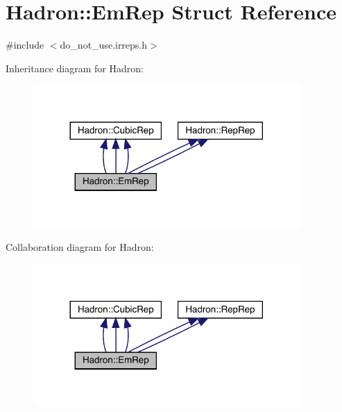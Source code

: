 \hypertarget{structHadron_1_1EmRep}{}\section{Hadron\+:\+:Em\+Rep Struct Reference}
\label{structHadron_1_1EmRep}


{\ttfamily \#include $<$do\+\_\+not\+\_\+use.\+irreps.\+h$>$}



Inheritance diagram for Hadron\+:
\nopagebreak
\begin{figure}[H]
\begin{center}
\leavevmode
\includegraphics[width=288pt]{d9/d56/structHadron_1_1EmRep__inherit__graph}
\end{center}
\end{figure}


Collaboration diagram for Hadron\+:
\nopagebreak
\begin{figure}[H]
\begin{center}
\leavevmode
\includegraphics[width=288pt]{db/d39/structHadron_1_1EmRep__coll__graph}
\end{center}
\end{figure}
